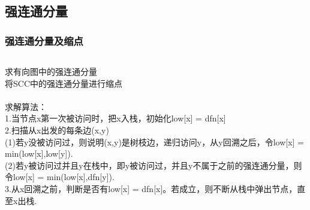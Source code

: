 \documentclass[twoside]{article}
\begin{document}
\subsection{强连通分量}
\subsubsection{强连通分量及缩点}
\begin{lstlisting}
\end{lstlisting}
求有向图中的强连通分量\\
将SCC中的强连通分量进行缩点\\
\\
求解算法：\\
\quad 1.当节点x第一次被访问时，把x入栈，初始化low[x] = dfn[x]\\
\quad 2.扫描从x出发的每条边(x,y)\\
\quad \quad(1)若y没被访问过，则说明(x,y)是树枝边，递归访问y，从y回溯之后，令low[x] = min(low[x],low[y]).\\
\quad \quad(2)若y被访问过并且y在栈中，即y被访问过，并且y不属于之前的强连通分量，则令low[x] = min(low[x],dfn[y]).\\
\quad 3.从x回溯之前，判断是否有low[x] = dfn[x]。若成立，则不断从栈中弹出节点，直至x出栈.\\
\end{document}
